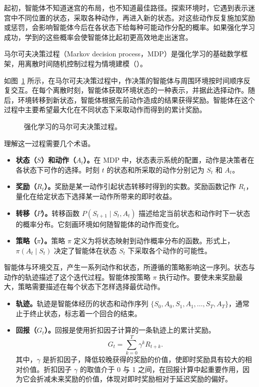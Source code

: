 起初，智能体不知道迷宫的布局，也不知道最佳路径。探索环境时，它遇到表示迷宫中不同位置的状态，采取各种动作，再进入新的状态。对这些动作反复施加奖励或惩罚，会影响智能体今后在各状态下给每种可能动作分配的概率。如果强化学习成功，学到的这些概率会使智能体比起初更高效地走出迷宫。

马尔可夫决策过程（Markov decision process，MDP）是强化学习的基础数学框架，用离散时间随机控制过程为情境建模（）。

如图~\ref{fig:ch05-mdp} 所示，在马尔可夫决策过程中，作决策的智能体与周围环境按时间顺序反复交互。在每个离散时刻，智能体获取环境状态的一种表示，并据此选择动作。随后，环境转移到新状态，智能体根据先前动作造成的结果获得奖励。智能体在这个过程中主要希望最大化在不同状态下采取动作而得到的累计奖励。

\begin{figure}[!htbp]
\centering

\caption{强化学习的马尔可夫决策过程。}
\label{fig:ch05-mdp}
\end{figure}

理解这一过程需要几个术语。

\begin{itemize}
\item \textbf{状态（$S$）和动作（$A_t$）。}在 MDP 中，状态表示系统的配置，动作是决策者在各状态下可作的选择。时刻 $t$ 的状态和所采取的动作分别记为 $S_t$ 和 $A_t$。
\item \textbf{奖励（$R_t$）。}奖励是某一动作引起状态转移时得到的实数。奖励函数记作 $R_t$，量化在给定状态下选择某一动作所带来的即时收益。
\item \textbf{转移（$P$）。}转移函数 $P(S_{t+1}\mid S_t,A_t)$ 描述给定当前状态和动作时下一状态的概率分布。它刻画环境如何随智能体的动作而变化。
\item \textbf{策略（$\pi$）。}策略 $\pi$ 定义为将状态映射到动作概率分布的函数。形式上，$\pi(A_t\mid S_t)$ 决定了智能体在状态 $S_t$ 下采取各个动作的可能性。
\end{itemize}

智能体与环境交互，产生一系列动作和状态，所遵循的策略影响这一序列。状态与动作的轨迹描述了这个迭代过程。智能体按策略 $\pi$ 执行动作。要使未来奖励最大，策略需要描述在每个状态下怎样选择最优动作。

\begin{itemize}
\item \textbf{轨迹。}轨迹是智能体经历的状态和动作序列 $\{S_0,A_0,\allowbreak S_1,A_1,\allowbreak\ldots,\allowbreak S_T,A_T\}$，通常止于终止状态，标志着一个回合的结束。
\item \textbf{回报（$G_t$）。}回报是使用折扣因子计算的一条轨迹上的累计奖励。
\[
G_t=\sum_{k=0}^{T}\gamma^k R_{t+k}.
\]
其中，$\gamma$ 是折扣因子，降低较晚获得的奖励的价值，使即时奖励具有较大的相对价值。折扣因子 $\gamma$ 的取值介于 0 与 1 之间，在回报计算中起重要作用，因为它会折减未来奖励的价值，体现对即时奖励相对于延迟奖励的偏好。
\end{itemize}

